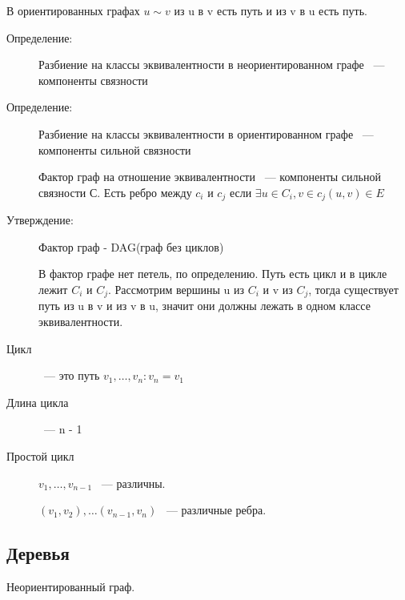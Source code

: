 \documentclass[12pt]{article}
\begin{document}
В ориентированных графах $u \sim v$ из u в v есть путь и из v в u есть путь.

\begin{description}
\item[Определение:]
Разбиение на классы эквивалентности в неориентированном графе ~--- компоненты связности

\item[Определение:]
Разбиение на классы эквивалентности в ориентированном графе ~--- компоненты сильной связности

Фактор граф на отношение эквивалентности ~--- компоненты сильной связности С. Есть ребро между $c_i$ и $c_j$ если $\exists u \in C_i, v \in c_j (u, v) \in E$

\item[Утверждение:] Фактор граф - DAG(граф без циклов)

В фактор графе нет петель, по определению. Путь есть цикл и в цикле лежит $C_i$ и $C_j$. Рассмотрим вершины u из $C_i$ и v из $C_j$, тогда существует путь из u в v и из v в u, значит они должны лежать в одном классе эквивалентности. 

\item[Цикл] ~--- это путь $v_1, \ldots, v_n: v_n = v_1$

\item[Длина цикла] ~--- n - 1

\item[Простой цикл] $v_1, \ldots, v_{n- 1}$ ~--- различны. 

$(v_1, v_2), \ldots (v_{n - 1}, v_n)$ ~--- различные ребра. 
\end{description}

\subsection{Деревья}

Неориентированный граф. 
\end{document}
